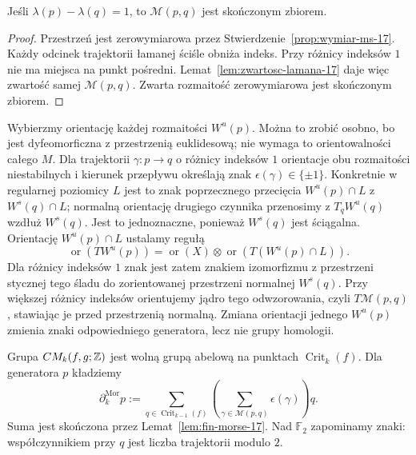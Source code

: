 \begin{lemat}
\label{lem:fin-morse-17}
Jeśli $\lambda(p)-\lambda(q)=1$,
to $\mathcal M(p,q)$ jest
skończonym zbiorem.
\end{lemat}
\begin{proof}
Przestrzeń jest zerowymiarowa przez
Stwierdzenie~\ref{prop:wymiar-ms-17}.
Każdy odcinek trajektorii łamanej ściśle obniża indeks.
Przy różnicy indeksów $1$ nie ma miejsca na punkt pośredni.
Lemat~\ref{lem:zwartosc-lamana-17} daje więc zwartość
samej $\mathcal M(p,q)$. Zwarta rozmaitość
zerowymiarowa jest skończonym zbiorem.
\end{proof}

Wybierzmy orientację każdej
rozmaitości $W^u(p)$.
Można to zrobić osobno,
bo jest dyfeomorficzna
z przestrzenią euklidesową;
nie wymaga to orientowalności
całego $M$. Dla trajektorii
$\gamma:p\to q$ o różnicy
indeksów $1$ orientacje
obu rozmaitości niestabilnych
i kierunek przepływu określają
znak $\epsilon(\gamma)\in\{\pm1\}$.
Konkretnie w regularnej
poziomicy $L$ jest to znak
poprzecznego przecięcia
$W^u(p)\cap L$ z
$W^s(q)\cap L$;
normalną orientację drugiego czynnika
przenosimy z $T_qW^u(q)$ wzdłuż $W^s(q)$.
Jest to jednoznaczne, ponieważ $W^s(q)$ jest ściągalna.
Orientację $W^u(p)\cap L$ ustalamy regułą
\[
 \operatorname{or}(TW^u(p))
 =\operatorname{or}(X)\otimes
   \operatorname{or}(T(W^u(p)\cap L)).
\]
Dla różnicy indeksów $1$ znak jest zatem znakiem
izomorfizmu z przestrzeni stycznej tego śladu
do zorientowanej przestrzeni normalnej $W^s(q)$.
Przy większej różnicy indeksów orientujemy jądro
tego odwzorowania, czyli $T\mathcal M(p,q)$,
stawiając je przed przestrzenią normalną.
Zmiana orientacji jednego
$W^u(p)$ zmienia znaki
odpowiedniego generatora,
lecz nie grupy homologii.

\begin{definicja}
\label{def:kompleks-morse-17}
Grupa $CM_k(f,g;\mathbb{Z})$ jest wolną
grupą abelową na punktach
$\operatorname{Crit}_k(f)$.
Dla generatora $p$ kładziemy
\begin{equation}\label{eq:brzeg-morse-17}
 \partial^{\mathrm{Mor}}_k p
 :=\sum_{q\in\operatorname{Crit}_{k-1}(f)}
  \left(\sum_{\gamma\in\mathcal M(p,q)}
                    \epsilon(\gamma)\right)q.
\end{equation}
Suma jest skończona przez
Lemat~\ref{lem:fin-morse-17}.
Nad $\mathbb F_2$ zapominamy znaki:
współczynnikiem przy $q$
jest liczba trajektorii modulo $2$.
\end{definicja}

